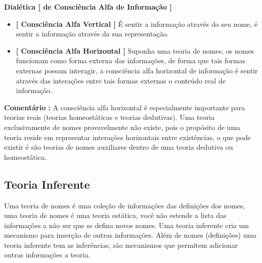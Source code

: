 \documentclass[10pt,a4paper]{report}
\begin{document}
\textbf{Dialética [ de Consciência Alfa de Informação ]}

\begin{itemize}
	\item[ (i) ] \textbf{[ Consciência Alfa Vertical ]} É sentir a informação através do seu nome, é sentir a informação através da sua representação.
	\item[ (ii) ] \textbf{[ Consciência Alfa Horizontal ]} Suponha uma teoria de nomes, os nomes funcionam como forma externa das informações, de forma que tais formas externas possam interagir, a consciência alfa horizontal de informação é sentir através das interações entre tais formas externas o conteúdo real de informação.
\end{itemize}

\textbf{Comentário :} A consciência alfa horizontal é especialmente importante para teorias reais (teorias homeostáticas e teorias dedutivas). Uma teoria exclusivamente de nomes provavelmente não existe, pois o propósito de uma teoria reside em representar interações horizontais entre existências, o que pode existir é são teorias de nomes auxiliares dentro de uma teoria dedutiva ou homeostática.


\subsection{Teoria Inferente}

\hspace{\baselineskip}

Uma teoria de nomes é uma coleção de informações das definições dos nomes, uma teoria de nomes é uma teoria estática, você não estende a lista das informações a não ser que se defina novos nomes. Uma teoria inferente cria um mecanismo para inserção de outras informações. Além de nomes (definições) uma teoria inferente tem as inferências, são mecanismos que permitem adicionar outras informações a teoria.

\hspace{\baselineskip}
\end{document}
